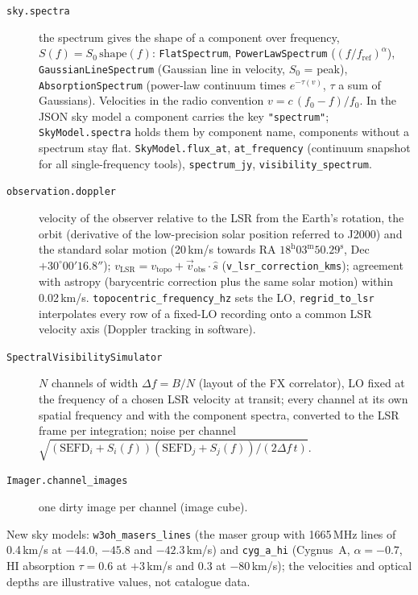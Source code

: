 \begin{description}
  \item[\texttt{sky.spectra}] the spectrum gives the shape of a component
        over frequency, $S(f) = S_0\,\mathrm{shape}(f)$:
        \texttt{FlatSpectrum}, \texttt{PowerLawSpectrum} ($(f/f_\mathrm{ref})^\alpha$),
        \texttt{GaussianLineSpectrum} (Gaussian line in velocity, $S_0$ = peak),
        \texttt{AbsorptionSpectrum} (power-law continuum times $e^{-\tau(v)}$,
        $\tau$ a sum of Gaussians). Velocities in the radio convention
        $v = c\,(f_0-f)/f_0$. In the JSON sky model a component carries the key
        \texttt{"spectrum"}; \texttt{SkyModel.spectra} holds them by component
        name, components without a spectrum stay flat.
        \texttt{SkyModel.flux\_at}, \texttt{at\_frequency} (continuum snapshot for
        all single-frequency tools), \texttt{spectrum\_jy},
        \texttt{visibility\_spectrum}.
  \item[\texttt{observation.doppler}] velocity of the observer relative to
        the LSR from the Earth's rotation, the orbit (derivative of the
        low-precision solar position referred to J2000) and the standard solar
        motion (20\,km/s towards RA $18^\mathrm{h}03^\mathrm{m}50.29^\mathrm{s}$,
        Dec $+30^\circ00'16.8''$); $v_\mathrm{LSR} = v_\mathrm{topo} +
        \vec v_\mathrm{obs}\cdot\hat s$ (\texttt{v\_lsr\_correction\_kms});
        agreement with astropy (barycentric correction plus the same solar
        motion) within 0.02\,km/s. \texttt{topocentric\_frequency\_hz} sets the
        LO, \texttt{regrid\_to\_lsr} interpolates every row of a fixed-LO
        recording onto a common LSR velocity axis (Doppler tracking in
        software).
  \item[\texttt{SpectralVisibilitySimulator}] $N$ channels of width
        $\Delta f = B/N$ (layout of the FX correlator), LO fixed at the
        frequency of a chosen LSR velocity at transit; every channel at its own
        spatial frequency and with the component spectra, converted to the LSR
        frame per integration; noise per channel
        $\sqrt{(\mathrm{SEFD}_i+S_i(f))(\mathrm{SEFD}_j+S_j(f))/(2\Delta f\,t)}$.
  \item[\texttt{Imager.channel\_images}] one dirty image per channel (image
        cube).
\end{description}
New sky models: \texttt{w3oh\_masers\_lines} (the maser group with
1665\,MHz lines of 0.4\,km/s at $-44.0$, $-45.8$ and $-42.3$\,km/s) and
\texttt{cyg\_a\_hi} (Cygnus~A, $\alpha = -0.7$, HI absorption $\tau = 0.6$ at
$+3$\,km/s and 0.3 at $-80$\,km/s); the velocities and optical depths are
illustrative values, not catalogue data.


